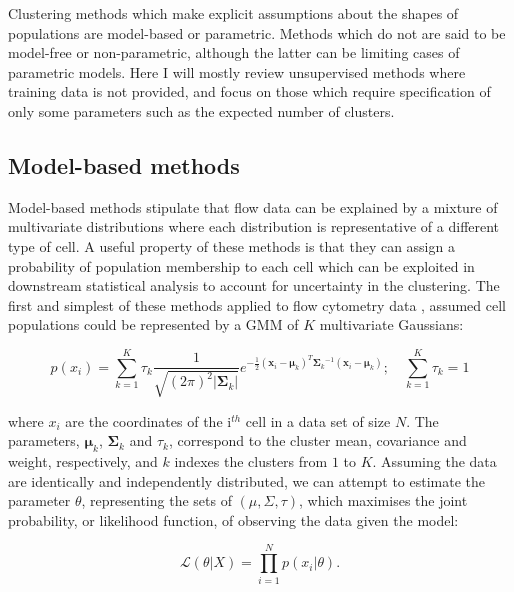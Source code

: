 Clustering methods which make explicit assumptions about the shapes of populations are model-based or parametric.
Methods which do not are said to be model-free or non-parametric,
although the latter can be limiting cases of parametric models.
Here I will mostly review unsupervised methods where training data is not provided,
and focus on those which require specification of only some parameters such as the expected
number of clusters.

\subsection{Model-based methods}

Model-based methods stipulate that flow data can be explained by a mixture of multivariate distributions where each distribution is representative of a different type of cell.
A useful property of these methods is that they can assign a probability of population membership to each cell which can be exploited in downstream statistical analysis to account for uncertainty in the clustering.
The first and simplest of these methods applied to flow cytometry data \citep{Chan:2008gq}, assumed cell populations could be represented by
a \acrfull{GMM} of $K$ multivariate Gaussians:

\[
p(x_i) = \sum_{k=1}^K\tau_k \frac{1}{\sqrt{(2\pi)^2|\boldsymbol\Sigma_k|}}
e^{-\frac{1}{2}({\mathbf x_i}-{\boldsymbol\mu_k})^T{\boldsymbol\Sigma_k}^{-1}({\mathbf x_i}-{\boldsymbol\mu_k})
}; \quad \sum_{k=1}^K\tau_k = 1
\]

where $x_i$ are the coordinates of the i$^{th}$ cell in a data set of size $N$.
The parameters, $\boldsymbol\mu_k$, $\boldsymbol\Sigma_k$ and $\tau_k$,
correspond to the cluster mean, covariance and weight, respectively, and $k$ indexes the clusters from $1$ to $K$.
Assuming the data are identically and independently distributed, we can attempt to estimate
the parameter $\theta$, representing the sets of $(\mu, \Sigma, \tau)$, which maximises the joint probability,
or likelihood function, of observing the data given the model:

\[
\mathcal{L}(\theta |X) = \prod_{i=1}^N p(x_i|\theta).
\]


